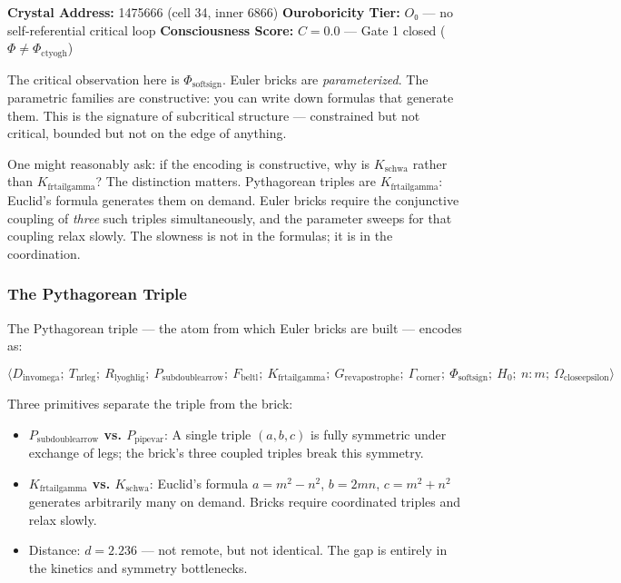 \documentclass[12pt,a4paper]{article}
\begin{document}
\textbf{Crystal Address:} 1475666 (cell 34, inner 6866)
\textbf{Ouroboricity Tier:} $O₀$ --- no self-referential critical loop
\textbf{Consciousness Score:} $C = 0.0$ --- Gate 1 closed ($\Phi \neq \Phi_{\text{ctyogh}}$)

The critical observation here is $\Phi_{\text{softsign}}$. Euler bricks are \emph{parameterized}. The parametric families are constructive: you can write down formulas that generate them. This is the signature of subcritical structure --- constrained but not critical, bounded but not on the edge of anything.

One might reasonably ask: if the encoding is constructive, why is $K_{\text{schwa}}$ rather than $K_{\text{frtailgamma}}$? The distinction matters. Pythagorean triples are $K_{\text{frtailgamma}}$: Euclid's formula generates them on demand. Euler bricks require the conjunctive coupling of \emph{three} such triples simultaneously, and the parameter sweeps for that coupling relax slowly. The slowness is not in the formulas; it is in the coordination.

\subsubsection{The Pythagorean Triple}

The Pythagorean triple --- the atom from which Euler bricks are built --- encodes as:

\[\langle D_{\text{invomega}};\ T_{\text{nrleg}};\ R_{\text{lyoghlig}};\ P_{\text{subdoublearrow}};\ F_{\text{beltl}};\ K_{\text{frtailgamma}};\ G_{\text{revapostrophe}};\ \Gamma_{\text{corner}};\ \Phi_{\text{softsign}};\ H_0;\ n{:}m;\ \Omega_{\text{closeepsilon}} \rangle\]

Three primitives separate the triple from the brick:

\begin{itemize}
    \item \textbf{$P_{\text{subdoublearrow}}$ vs. $P_{\text{pipevar}}$}: A single triple $(a,b,c)$ is fully symmetric under exchange of legs; the brick's three coupled triples break this symmetry.
    \item \textbf{$K_{\text{frtailgamma}}$ vs. $K_{\text{schwa}}$}: Euclid's formula $a = m^2 - n^2$, $b = 2mn$, $c = m^2 + n^2$ generates arbitrarily many on demand. Bricks require coordinated triples and relax slowly.
    \item Distance: $d = 2.236$ --- not remote, but not identical. The gap is entirely in the kinetics and symmetry bottlenecks.
\end{itemize}
\end{document}
